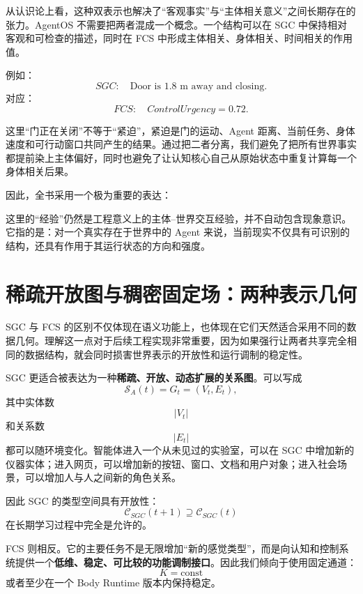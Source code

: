 从认识论上看，这种双表示也解决了“客观事实”与“主体相关意义”之间长期存在的张力。AgentOS 不需要把两者混成一个概念。一个结构可以在 SGC 中保持相对客观和可检查的描述，同时在 FCS 中形成主体相关、身体相关、时间相关的作用值。

例如：
\[
SGC:
\quad
\text{Door is 1.8 m away and closing.}
\]
对应：
\[
FCS:
\quad
ControlUrgency=0.72.
\]

这里“门正在关闭”不等于“紧迫”，紧迫是门的运动、Agent 距离、当前任务、身体速度和可行动窗口共同产生的结果。通过把二者分离，我们避免了把所有世界事实都提前染上主体偏好，同时也避免了让认知核心自己从原始状态中重复计算每一个身体相关后果。

因此，全书采用一个极为重要的表达：
\begin{statementbox}
\centering
{}
\end{statementbox}
\begin{statementbox}
\centering
{}
\end{statementbox}

这里的“经验”仍然是工程意义上的主体--世界交互经验，并不自动包含现象意识。它指的是：对一个真实存在于世界中的 Agent 来说，当前现实不仅具有可识别的结构，还具有作用于其运行状态的方向和强度。


\section{稀疏开放图与稠密固定场：两种表示几何}

SGC 与 FCS 的区别不仅体现在语义功能上，也体现在它们天然适合采用不同的数据几何。理解这一点对于后续工程实现非常重要，因为如果强行让两者共享完全相同的数据结构，就会同时损害世界表示的开放性和运行调制的稳定性。

SGC 更适合被表达为一种\textbf{稀疏、开放、动态扩展的关系图}。可以写成
\[
\mathcal S_A(t)
=
G_t
=
(V_t,E_t),
\]
其中实体数
\[
|V_t|
\]
和关系数
\[
|E_t|
\]
都可以随环境变化。智能体进入一个从未见过的实验室，可以在 SGC 中增加新的仪器实体；进入网页，可以增加新的按钮、窗口、文档和用户对象；进入社会场景，可以增加人与人之间新的角色关系。

因此 SGC 的类型空间具有开放性：
\[
\mathcal C_{SGC}(t+1)
\supseteq
\mathcal C_{SGC}(t)
\]
在长期学习过程中完全是允许的。

FCS 则相反。它的主要任务不是无限增加“新的感觉类型”，而是向认知和控制系统提供一个\textbf{低维、稳定、可比较的功能调制接口}。因此我们倾向于使用固定通道：
\[
K=\mathrm{const}
\]
或者至少在一个 Body Runtime 版本内保持稳定。

